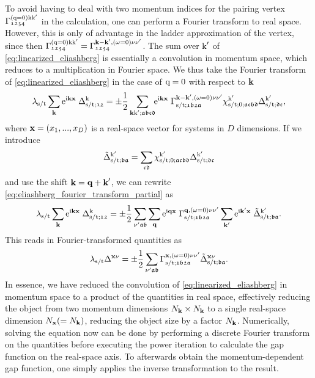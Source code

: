 \documentclass[\main/main.tex]{subfiles}
\begin{document}
To avoid having to deal with two momentum indices for the pairing vertex $\Gamma_{\mathfrak{1234}}^{(\text{q}=0)\text{k}\text{k}'}$ in the calculation, one can perform a Fourier transform to real space. However, this is only of advantage in the ladder approximation of the vertex, since then $\Gamma_{\mathfrak{1234}}^{(\text{q}=0)\text{k}\text{k}'}=\Gamma_{\mathfrak{1234}}^{\textbf{k}-\textbf{k}',(\omega=0)\nu\nu'}$. The sum over $\text{k}'$ of \eqref{eq:linearized_eliashberg} is essentially a convolution in momentum space, which reduces to a multiplication in Fourier space. We thus take the Fourier transform of \eqref{eq:linearized_eliashberg} in the case of $\text{q}=0$ with respect to $\textbf{k}$
\begin{align}\label{eq:eliashberg_fourier_transform_partial}
	\lambda_{\text{s}/\text{t}}\sum_{\textbf{k}}\mathrm{e}^{\mathrm{i}\textbf{kx}}\;\Delta_{\text{s}/\text{t};\mathfrak{12}}^{\text{k}}=\pm\frac{1}{2}\sum_{\textbf{k}\text{k}';\mathfrak{abcd}}\!\!\mathrm{e}^{\mathrm{i}\textbf{kx}}\;\Gamma^{\textbf{k}-\textbf{k}',(\omega=0)\nu\nu'}_{\text{s}/\text{t};\mathfrak{1b2a}}\chi^{\text{k}'}_{\text{s}/\text{t};0;\mathfrak{acbd}}\Delta_{\text{s}/\text{t};\mathfrak{dc}}^{\text{k}'},
\end{align}
where $\textbf{x}=(x_1,...,x_D)$ is a real-space vector for systems in $D$ dimensions. If we introduce
\begin{align}
	\tilde\Delta^{\text{k}'}_{\text{s}/\text{t};\mathfrak{ba}}=\sum_{\mathfrak{cd}}\chi^{\text{k}'}_{\text{s}/\text{t};0;\mathfrak{acbd}}\Delta_{\text{s}/\text{t};\mathfrak{dc}}^{\text{k}'}
\end{align}
and use the shift $\textbf{k}=\textbf{q}+\textbf{k}'$, we can rewrite \eqref{eq:eliashberg_fourier_transform_partial} as
\begin{align}
	\lambda_{\text{s}/\text{t}}\sum_{\textbf{k}}\mathrm{e}^{\mathrm{i}\textbf{kx}}\; \Delta_{\text{s}/\text{t};\mathfrak{12}}^{\text{k}}=\pm\frac12\sum_{\nu'\mathfrak{ab}}\sum_{\textbf{q}}\mathrm{e}^{\mathrm{i}\textbf{qx}}\;\Gamma^{\textbf{q},(\omega=0)\nu\nu'}_{\text{s}/\text{t};\mathfrak{1b2a}}\sum_{\textbf{k}'}\mathrm{e}^{\mathrm{i}\textbf{k}'\textbf{x}}\;\tilde\Delta^{\text{k}'}_{\text{s}/\text{t};\mathfrak{ba}}.
\end{align}
This reads in Fourier-transformed quantities as
\begin{align}
	\lambda_{\text{s}/\text{t}} \Delta^{\textbf{x}\nu}=\pm\frac12\sum_{\nu'\mathfrak{ab}}\Gamma^{\textbf{x},(\omega=0)\nu\nu'}_{\text{s}/\text{t};\mathfrak{1b2a}}\tilde\Delta^{\textbf{x}\nu}_{\text{s}/\text{t};\mathfrak{ba}}.
\end{align}
In essence, we have reduced the convolution of \eqref{eq:linearized_eliashberg} in momentum space to a product of the quantities in real space, effectively reducing the object from two momentum dimensions $N_{\textbf{k}}\times N_{\textbf{k}}$ to a single real-space dimension $N_{\textbf{x}}(=N_{\textbf{k}})$, reducing the object size by a factor $N_{\textbf{k}}$. Numerically, solving the equation now can be done by performing a discrete Fourier transform on the quantities before executing the power iteration to calculate the gap function on the real-space axis. To afterwards obtain the momentum-dependent gap function, one simply applies the inverse transformation to the result.
\end{document}
